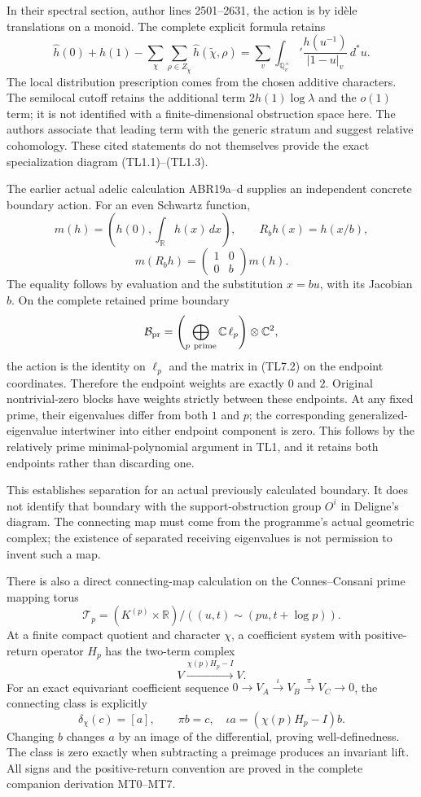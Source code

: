 In their spectral section, author lines 2501--2631, the action is by
idèle translations on a monoid. The complete explicit formula retains \[
\widehat h(0)+\widehat h(1)
-\sum_{\chi}\sum_{\rho\in Z_{\tilde\chi}}\widehat h(\tilde\chi,\rho)
=\sum_v\int_{\mathbb Q_v^\times}'\frac{h(u^{-1})}{|1-u|_v}\,d^*u.
\tag{TL7.1}
\] The local distribution prescription comes from the chosen additive
characters. The semilocal cutoff retains the additional term
\(2h(1)\log\lambda\) and the \(o(1)\) term; it is not identified with a
finite-dimensional obstruction space here. The authors associate that
leading term with the generic stratum and suggest relative cohomology.
These cited statements do not themselves provide the exact
specialization diagram (TL1.1)--(TL1.3).

The earlier actual adelic calculation ABR19a--d supplies an independent
concrete boundary action. For an even Schwartz function, \[
m(h)=\left(h(0),\int_{\mathbb R}h(x)\,dx\right),\qquad
R_bh(x)=h(x/b),
\] \[
m(R_bh)=
\begin{pmatrix}1&0\\0&b\end{pmatrix}m(h).
\tag{TL7.2}
\] The equality follows by evaluation and the substitution \(x=bu\),
with its Jacobian \(b\). On the complete retained prime boundary \[
\mathcal B_{\rm pr}
=\left(\bigoplus_{p\ {\rm prime}}\mathbb C\,\ell_p\right)
\otimes\mathbb C^2,
\] the action is the identity on \(\ell_p\) and the matrix in (TL7.2) on
the endpoint coordinates. Therefore the endpoint weights are exactly
\(0\) and \(2\). Original nontrivial-zero blocks have weights strictly
between these endpoints. At any fixed prime, their eigenvalues differ
from both \(1\) and \(p\); the corresponding generalized-eigenvalue
intertwiner into either endpoint component is zero. This follows by the
relatively prime minimal-polynomial argument in TL1, and it retains both
endpoints rather than discarding one.

This establishes separation for an actual previously calculated
boundary. It does not identify that boundary with the
support-obstruction group \(O^i\) in Deligne's diagram. The connecting
map must come from the programme's actual geometric complex; the
existence of separated receiving eigenvalues is not permission to invent
such a map.

There is also a direct connecting-map calculation on the Connes--Consani
prime mapping torus \[
\mathcal T_p=(K^{(p)}\times\mathbb R)/
((u,t)\sim(pu,t+\log p)).
\] At a finite compact quotient and character \(\chi\), a coefficient
system with positive-return operator \(H_p\) has the two-term complex \[
V\xrightarrow{\chi(p)H_p-I}V.
\tag{TL7.3}
\] For an exact equivariant coefficient sequence
\(0\to V_A\xrightarrow{\iota}V_B\xrightarrow{\pi}V_C\to0\), the
connecting class is explicitly \[
\delta_\chi(c)=[a],\qquad
\pi b=c,\quad\iota a=(\chi(p)H_p-I)b.
\tag{TL7.4}
\] Changing \(b\) changes \(a\) by an image of the differential, proving
well-definedness. The class is zero exactly when subtracting a preimage
produces an invariant lift. All signs and the positive-return convention
are proved in the complete companion derivation MT0--MT7.

